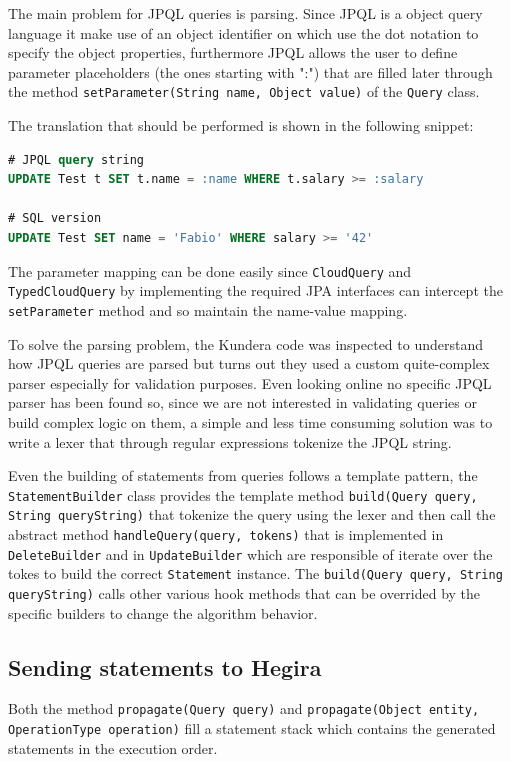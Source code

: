 \newparagraph The main problem for JPQL queries is parsing. Since JPQL is a  object query language it make use of an object identifier on which use the dot notation to specify the object properties, furthermore JPQL allows the user to define parameter placeholders (the ones starting with ":") that are filled later through the method \texttt{setParameter(String name, Object value)} of the \texttt{Query} class.

\noindent The translation that should be performed is shown in the following snippet:

\begin{lstlisting}[language=SQL, caption=JPQL to SQL translation, label=code:query-translation, numbers=none]
# JPQL query string
UPDATE Test t SET t.name = :name WHERE t.salary >= :salary

# SQL version
UPDATE Test SET name = 'Fabio' WHERE salary >= '42'
\end{lstlisting} 

\noindent The parameter mapping can be done easily since \texttt{CloudQuery} and \texttt{TypedCloudQuery} by implementing the required JPA interfaces can intercept the \texttt{setParameter} method and so maintain the name-value mapping.

\newparagraph To solve the parsing problem, the Kundera code was inspected to understand how JPQL queries are parsed but turns out they used a custom quite-complex parser especially for validation purposes. Even looking online no specific JPQL parser has been found so, since we are not interested in validating queries or build complex logic on them, a simple and less time consuming solution was to write a lexer that through regular expressions tokenize the JPQL string.

\noindent Even the building of statements from queries follows a template pattern, the \texttt{StatementBuilder} class provides the template method \texttt{build(Query query, String queryString)} that tokenize the query using the lexer and then call the abstract method \texttt{handleQuery(query, tokens)} that is implemented in \texttt{DeleteBuilder} and in \texttt{UpdateBuilder} which are responsible of iterate over the tokes to build the correct \texttt{Statement} instance.
The \texttt{build(Query query, String queryString)} calls other various hook methods that can be overrided by the specific builders to change the algorithm behavior.

\subsection{Sending statements to Hegira}
Both the method \texttt{propagate(Query query)} and \texttt{propagate(Object entity, OperationType operation)} fill a statement stack which contains the generated statements in the execution order.

